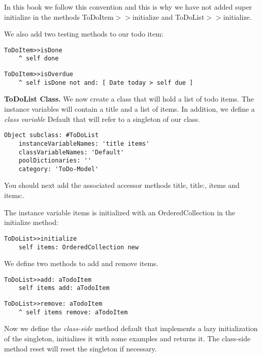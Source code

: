 \documentclass[a4paper,10pt,twoside]{book}
\newcommand{\ct}[1]{{\small\ttfamily\textup{#1}}}
\begin{document}
In this book we follow this convention and this is why we have not added \ct{super initialize} in the methods \ct{ToDoItem$>$$>$initialize} and \ct{ToDoList$>$$>$initialize}.

We also add two testing methods to our todo item:

\begin{lstlisting}
ToDoItem>>isDone
    ^ self done
\end{lstlisting}

\begin{lstlisting}
ToDoItem>>isOverdue
    ^ self isDone not and: [ Date today > self due ]
\end{lstlisting}

\textbf{ToDoList Class.} We now create a class that will hold a list of todo items. The instance variables will contain a title and a list of items. In addition, we define a \textit{class variable} \ct{Default} that will refer to a singleton of our class.

\begin{lstlisting}
Object subclass: #ToDoList
    instanceVariableNames: 'title items'
    classVariableNames: 'Default'
    poolDictionaries: ''
    category: 'ToDo-Model'
\end{lstlisting}

You should next add the associated accessor methods \ct{title}, \ct{title:}, \ct{items} and \ct{items:}. 

The instance variable \ct{items} is initialized with an \ct{OrderedCollection} in the \ct{initialize} method:

\begin{lstlisting}
ToDoList>>initialize
    self items: OrderedCollection new
\end{lstlisting}

We define two methods to add and remove items.

\begin{lstlisting}
ToDoList>>add: aTodoItem
    self items add: aTodoItem
\end{lstlisting}

\begin{lstlisting}
ToDoList>>remove: aTodoItem
    ^ self items remove: aTodoItem
\end{lstlisting}

Now we define the \textit{class-side} method \ct{default} that implements a lazy initialization of the singleton, initializes it with some examples and returns it. The class-side method \ct{reset} will reset the singleton if necessary.
\end{document}
